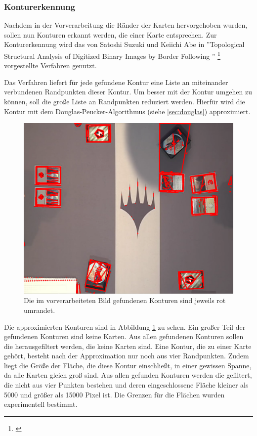 \subsubsection{Konturerkennung}

Nachdem in der Vorverarbeitung die Ränder der Karten hervorgehoben wurden, sollen nun Konturen erkannt werden, die einer Karte entsprechen.
Zur Konturerkennung wird das von Satoshi Suzuki und Keiichi Abe in ''Topological Structural Analysis of Digitized Binary
Images by Border Following '' \footnote{\cite{journals/cvgip/SuzukiA85}} vorgestellte Verfahren genutzt.

Das Verfahren liefert für jede gefundene Kontur eine Liste an miteinander verbundenen Randpunkten dieser Kontur. Um besser mit der Kontur umgehen zu können, soll die große Liste an Randpunkten reduziert werden. 
Hierfür wird die Kontur mit dem Douglas-Peucker-Algorithmus (siehe \ref{sec:douglas}) approximiert.


\begin{figure}[h]
    \centering
		\includegraphics[scale=0.2]{bilder/findCardsContour.png}
    	\caption{Die im vorverarbeiteten Bild gefundenen Konturen sind jeweils rot umrandet.}
\label{fig:findCardsContour}
\end{figure}

Die approximierten Konturen sind in Abbildung \ref{fig:findCardsContour} zu sehen. Ein großer Teil der gefundenen Konturen sind keine Karten. Aus allen gefundenen Konturen sollen die herausgefiltert werden, die keine Karten sind.
Eine Kontur, die zu einer Karte gehört, besteht nach der Approximation nur noch aus vier Randpunkten. Zudem liegt die Größe der Fläche, die diese Kontur einschließt, in einer gewissen Spanne, da alle Karten gleich groß sind.
Aus allen gefunden Konturen werden die gefiltert, die nicht aus vier Punkten bestehen und deren eingeschlossene Fläche kleiner als 5000 und größer als 15000 Pixel ist. Die Grenzen für die Flächen wurden experimentell bestimmt.


